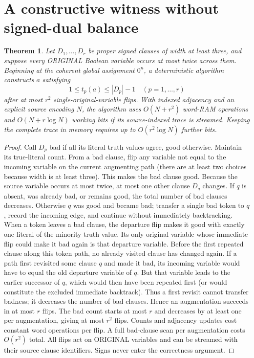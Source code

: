 \documentclass[10pt]{article}
\newtheorem{theorem}{Theorem}
\begin{document}
\section{A constructive witness without signed-dual balance}
\begin{theorem}
Let $D_1,\dots,D_r$ be proper signed clauses of width at least three, and suppose every ORIGINAL Boolean variable occurs at most twice across them. Beginning at the coherent global assignment $0^n$, a deterministic algorithm constructs $a$ satisfying
\[
1\le t_p(a)\le |D_p|-1\quad (p=1,\dots,r)
\]
after at most $r^2$ single-original-variable flips. With indexed adjacency and an explicit source encoding $N$, the algorithm uses $O(N+r^2)$ word-RAM operations and $O(N+r\log N)$ working bits if its source-indexed trace is streamed. Keeping the complete trace in memory requires up to $O(r^2\log N)$ further bits.
\end{theorem}
\begin{proof}
Call $D_p$ bad if all its literal truth values agree, good otherwise. Maintain its true-literal count. From a bad clause, flip any variable not equal to the incoming variable on the current augmenting path (there are at least two choices because width is at least three). This makes the bad clause good. Because the source variable occurs at most twice, at most one other clause $D_q$ changes. If $q$ is absent, was already bad, or remains good, the total number of bad clauses decreases. Otherwise $q$ was good and became bad; transfer a single bad token to $q$, record the incoming edge, and continue without immediately backtracking.
When a token leaves a bad clause, the departure flip makes it good with exactly one literal of the minority truth value. Its only original variable whose immediate flip could make it bad again is that departure variable. Before the first repeated clause along this token path, no already visited clause has changed again. If a path first revisited some clause $q$ and made it bad, its incoming variable would have to equal the old departure variable of $q$. But that variable leads to the earlier successor of $q$, which would then have been repeated first (or would constitute the excluded immediate backtrack). Thus a first revisit cannot transfer badness; it decreases the number of bad clauses. Hence an augmentation succeeds in at most $r$ flips. The bad count starts at most $r$ and decreases by at least one per augmentation, giving at most $r^2$ flips. Counts and adjacency updates cost constant word operations per flip. A full bad-clause scan per augmentation costs $O(r^2)$ total. All flips act on ORIGINAL variables and can be streamed with their source clause identifiers. Signs never enter the correctness argument.
\end{proof}
\end{document}
